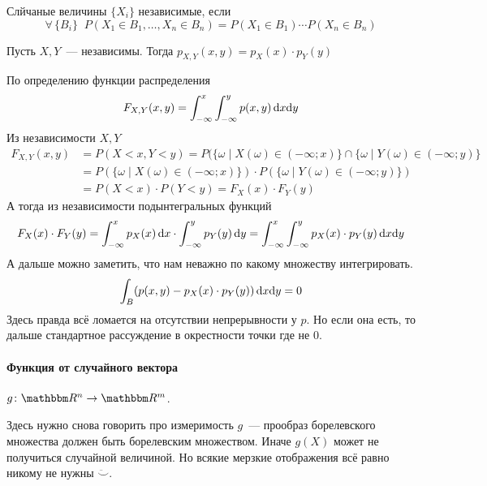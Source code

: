 \documentclass[12pt,timbord]{../../../notes}
\begin{document}
\begin{defn}\label{defn:stat::randvec::ind}
  Слйчаные величины $\{X_i\}$ независимые, если \[
    \forall\, \{B_i\} \;\; P(X_1 \in B_1, \dotsc, X_n \in B_n) = P(X_1\in B_1) \dotsm P(X_n \in B_n)
  \]
\end{defn}
\begin{prop}\label{prop:stat::randvec::ind}
  Пусть $X, Y$~--- независимы. Тогда $p_{X,Y}(x,y)=p_X(x) \cdot p_Y(y)$
\end{prop}
\begin{itlproof}
  По определению функции распределения
  \[
    F_{X,Y}(x,y) = \int_{-\infty}^x\int_{-\infty}^y p(x,y) \, \mathrm{d} x\mathrm{d} y
  \]
  Из независимости $X,Y$
  \[
    \begin{split}
      F_{X,Y} (x,y) &= P(X<x,Y<y) = P(\{\omega\mid X(\omega)\in (-\infty;x)\}\cap \{\omega\mid
        Y(\omega)\in (-\infty;y)\} \\
        &= P(\{\omega\mid X(\omega)\in (-\infty;x)\})\cdot
        P(\{\omega\mid Y(\omega)\in (-\infty;y)\}) \\
        &= P(X<x) \cdot P(Y<y) = F_X(x)\cdot F_Y(y)
      \end{split}
  \]
  А тогда из независимости подынтегральных функций
  \[
    F_X(x)\cdot F_Y(y) = \int_{-\infty}^x p_X(x) \, \mathrm{d} x \cdot \int_{-\infty}^y p_Y(y) \, \mathrm{d} y 
    = \int_{-\infty}^x\int_{-\infty}^y p_X(x)\cdot p_Y(y) \, \mathrm{d} x\mathrm{d} y
  \]
  А дальше можно заметить, что нам неважно по какому множеству интегрировать.
  \[
    \int_B (p(x,y) - p_X(x)\cdot p_Y(y)) \, \mathrm{d} x\mathrm{d} y = 0
  \]
  Здесь правда всё ломается на отсутствии непрерывности у $p$. Но если она есть, то дальше
  стандартное рассуждение в окрестности точки где не 0.
\end{itlproof}

\paragraph{Функция от случайного вектора}
\label{par:stat::funcrand}

\begin{defn}\label{defn:stat::funcrand::funcrand}
  $g \colon \R^n \to \R^m$. 
  \begin{itaux}
    Здесь нужно снова говорить про измеримость $g$~--- прообраз борелевского множества должен
    быть борелевским множеством. Иначе $g(X)$ может не получиться случайной величиной. Но всякие
    мерзкие отображения всё равно никому не нужны $\ddot\smile$.
  \end{itaux}
\end{defn}
\end{document}
